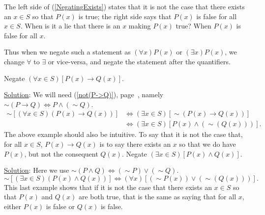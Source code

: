 The left side of (\ref{NegatingExists}) states that it is not
the case that there exists an $x\in S$ so that $P(x)$ is true;
the right side says that $P(x)$ is false for all $x\in S$.
When is it a lie that there is an $x$ making $P(x)$ true?
When $P(x)$ is false for all $x$.

Thus when we negate such a statement as
$(\forall x)P(x)$ or $(\exists x)P(x)$, we
change $\forall$ to $\exists$ or vice-versa, and
negate the statement after the quantifiers.

\bex Negate $(\forall x\in S)[P(x)\longrightarrow Q(x)]$.

\underline{Solution}: We will need (\ref{not(P->Q)}), 
page~\pageref{not(P->Q)}, namely $\sim(P\longrightarrow Q)\iff
           P\wedge(\sim Q)$.
\begin{align*}
\sim[(\forall x\in S)(P(x)\longrightarrow Q(x))]&
 \iff(\exists x\in S)[\sim(P(x)\longrightarrow Q(x))]\\
 &\iff(\exists x\in S)[P(x)\wedge(\sim(Q(x)))].\end{align*}
\eex
The above example should also be intuitive.  To say that
it is not the case that, for all $x\in S$, $P(x)\longrightarrow Q(x)$
is to say there exists an $x$ so that we do have $P(x)$, but not
the consequent $Q(x)$.
\bex Negate $(\exists x\in S)[P(x)\wedge Q(x)]$.

\underline{Solution}:  Here we use $\sim(P\wedge Q)\iff(\sim P)\vee(\sim Q)$.
$$\sim[(\exists x\in S)(P(x)\wedge Q(x))]
\iff(\forall x)[(\sim P(x))\vee(\sim(Q(x)))].$$
\eex
This last example shows that if it is not the case that
there exists an $x\in S$ so that $P(x)$ and $Q(x)$ are both true,
that is the same as saying that for all $x$, either
$P(x)$ is false or $Q(x)$ is false.
